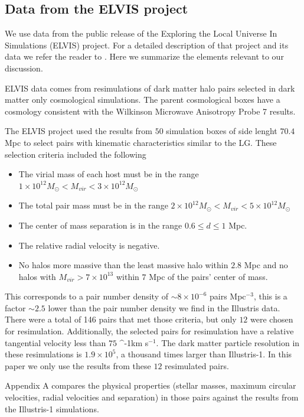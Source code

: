 \documentclass[a4paper,fleqn,usenatbib]{mnras}
\newcommand{\kms}{\ifmmode\mathrm{km\ s}^{-1}\else km s$^{-1}$\fi}
\begin{document}
\subsection{Data from the ELVIS project}
\label{sim:ELVIS}



We use data from the public release of the Exploring the Local
Universe In Simulations (ELVIS) project.
For a detailed description of that project and its data we refer the
reader to \cite{XX}. 
Here we summarize the elements relevant to our discussion.

ELVIS data comes from resimulations of dark matter halo pairs selected
in dark matter only cosmological simulations. 
The parent cosmological boxes have a cosmology consistent with the
Wilkinson Microwave Anisotropy Probe 7 results.


The ELVIS project used the results from $50$ simulation boxes of side
lenght $70.4$ Mpc to select pairs with kinematic characteristics
similar to the LG. 
These selection criteria included the following
\begin{itemize}
\item The virial mass of each host must be in the range 
$1\times
  10^{12} M_{\odot}< M_{vir}<3\times 10^{12}M_{\odot}$ 
\item The total pair mass must be in the range
$2\times
  10^{12} M_{\odot}< M_{vir}<5\times 10^{12}M_{\odot}$ 
\item The center of mass separation is in the range $0.6\leq d\leq1$
  Mpc.
\item The relative radial velocity is negative.
\item No halos more massive than the least massive halo within $2.8$
  Mpc and no halos with $M_{vir}>7\times 10^{13}$ within $7$ Mpc of
  the pairs' center of mass.
\end{itemize} 

This corresponds to a pair number density of $\sim 8 \times10^{-6}$ pairs
Mpc$^{-3}$, this is a factor $\sim 2.5$ lower than the pair number density
we find in the Illustris data.
There were a total of 146 pairs that met those criteria, but only $12$
were chosen for resimulation. 
Additionally, the selected pairs for resimulation have a relative
tangential velocity less than $75$ \kms. 
The dark matter particle resolution in these resimulations is
$1.9\times 10^5$, a thousand times larger than Illustris-1.
In this paper we only use the results from these $12$ resimulated pairs.

Appendix A compares the physical properties (stellar masses, maximum
circular velocities, radial velocities and separation) in those
pairs against the results from the Illustris-1 simulations.
\end{document}
